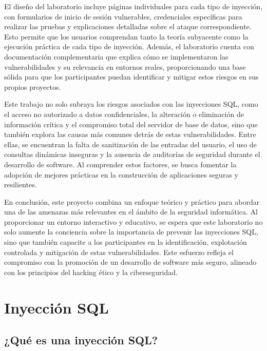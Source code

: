 \documentclass[a4paper,12pt]{article}
\begin{document}
El diseño del laboratorio incluye páginas individuales para cada tipo de inyección, con formularios de inicio de sesión 
vulnerables, credenciales específicas para realizar las pruebas y explicaciones detalladas sobre el ataque correspondiente.
 Esto permite que los usuarios comprendan tanto la teoría subyacente como la ejecución práctica de cada tipo de inyección. 
 Además, el laboratorio cuenta con documentación complementaria que explica cómo se implementaron las vulnerabilidades y su 
 relevancia en entornos reales, proporcionando una base sólida para que los participantes puedan identificar y mitigar estos 
 riesgos en sus propios proyectos.

 \vspace{0,5cm}
Este trabajo no solo subraya los riesgos asociados con las inyecciones SQL, como el acceso no autorizado a datos confidenciales,
 la alteración o eliminación de información crítica y el compromiso total del servidor de base de datos, sino que también explora 
 las causas más comunes detrás de estas vulnerabilidades. Entre ellas, se encuentran la falta de sanitización de las entradas del
  usuario, el uso de consultas dinámicas inseguras y la ausencia de auditorías de seguridad durante el desarrollo de software. Al
   comprender estos factores, se busca fomentar la adopción de mejores prácticas en la construcción de aplicaciones seguras y
    resilientes.
    
    \vspace{0,5cm}
En conclusión, este proyecto combina un enfoque teórico y práctico para abordar una de las amenazas más relevantes 
en el ámbito de la seguridad informática. Al proporcionar un entorno interactivo y educativo, se espera que este laboratorio 
no solo aumente la conciencia sobre la importancia de prevenir las inyecciones SQL, sino que también capacite a los participantes
 en la identificación, explotación controlada y mitigación de estas vulnerabilidades. Este esfuerzo refleja el compromiso con la 
 promoción de un desarrollo de software más seguro, alineado con los principios del hacking ético y la ciberseguridad.

 \section{Inyección SQL}

    \subsection{¿Qué es una inyección SQL?}
\end{document}

